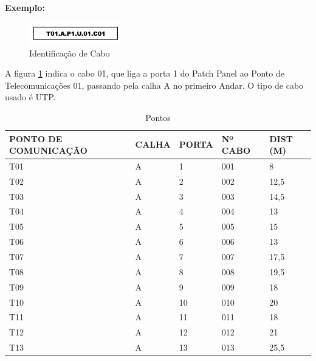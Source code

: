 \documentclass[	DIV=calc,%
paper=a4,%
fontsize=12pt,%
onecolumn]{scrartcl}	 					%
\begin{document}
	
    \textbf{Exemplo:} 
    
	\begin{figure}[h]
		\centering
		
		\includegraphics[width=4cm]{fig4}
		\caption{Identificação de Cabo}
		\label{fig4}
	\end{figure}
	A figura \ref{fig4} indica o cabo 01, que liga a porta 1 do Patch Panel ao Ponto de Telecomunicações 01, passando pela calha A no primeiro Andar. O tipo de cabo usado é UTP.
\clearpage	
\begin{table}[h]\footnotesize
	\centering
	\caption{Pontos}	
	\label{tab3} %
		\begin{tabular}{|l|l|l|l|l|}
			\hline
			PONTO DE COMUNICAÇÃO & CALHA & PORTA & Nº CABO & DIST (M)    \\ \hline
			T01                 & A     & 1                 & 001      & 8           \\ \hline
			T02                 & A     & 2                 & 002      & 12,5 \\ \hline
			T03                 & A     & 3                 & 003      & 14,5 \\ \hline
			T04                 & A     & 4                 & 004      & 13   \\ \hline
			T05                 & A     & 5                 & 005      & 15    \\ \hline
			T06                 & A     & 6                 & 006      & 13    \\ \hline
			T07                 & A     & 7                 & 007      & 17,5 \\ \hline
			T08                 & A     & 8                 & 008      & 19,5 \\ \hline
			T09                 & A     & 9                 & 009      & 18           \\ \hline
			T10                 & A     & 10                & 010      & 20           \\ \hline
			T11                 & A     & 11                & 011      & 18           \\ \hline
			T12                 & A     & 12                & 012      & 21           \\ \hline
			T13                 & A     & 13                & 013      & 25,5 \\ \hline

\end{tabular}
\end{table}
\end{document}
